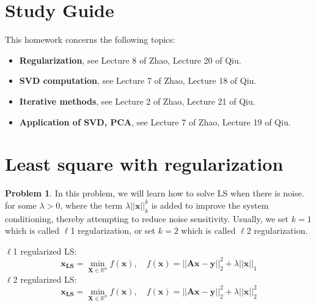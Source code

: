 \documentclass[english,onecolumn]{IEEEtran}
\newcommand{\Rbb}{\mathbb{R}}
\begin{document}
\section*{Study Guide}
\noindent
This homework concerns the following topics:
\begin{itemize}
    \item \textbf{Regularization}, see Lecture 8 of Zhao, Lecture 20 of Qiu.
    \item \textbf{SVD computation}, see Lecture 7 of Zhao, Lecture 18 of Qiu. 
    \item \textbf{Iterative methods}, see Lecture 2 of Zhao, Lecture 21 of Qiu. 
    \item \textbf{Application of SVD, PCA}, see Lecture 7 of Zhao, Lecture 19 of Qiu. 
\end{itemize}

\newpage
\section{Least square with regularization}
\noindent\textbf{Problem 1}. 
In this problem, we will learn how to solve LS when there is noise. for some $\lambda>0$, where the term $\lambda||\mathbf{x}||^{k}_{k}$ is added to improve the system conditioning, thereby attempting to reduce noise sensitivity. Usually, we set $k=1$ which is called $\ell$1 regularization, or set $k=2$ which is called $\ell$2 regularization. 

\noindent $\ell$1 regularized LS:
\begin{equation}
    \mathbf{x_{LS}}=\min_{\mathbf{X}\in\mathbf{\Rbb}^{n}}f(\mathbf{x}), \quad f(\mathbf{x})=||\mathbf{Ax-y}||^{2}_{2}+\lambda||\mathbf{x}||_{1}
\end{equation}
\noindent $\ell$2 regularized LS:
\begin{equation}
    \mathbf{x_{LS}}=\min_{\mathbf{X}\in\mathbf{\Rbb}^{n}}f(\mathbf{x}),\quad f(\mathbf{x})=||\mathbf{Ax-y}||^{2}_{2}+\lambda||\mathbf{x}||^{2}_{2}
\end{equation}
\end{document}
